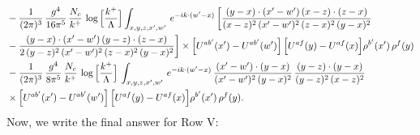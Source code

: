 \documentclass[9pt]{article}
\numberwithin{equation}{section}
\begin{document}
\begin{align}
&-\frac{1}{(2\pi)^{3}}\,\frac{g^{4}}{16\pi^{5}}\,\frac{N_{c}}{k^{+}}\,\log\Big[\frac{k^{+}}{\Lambda}\Big]\int_{x,y,z,x',w'}\,e^{-ik\cdot(w'-x)}\,\bigg[\frac{(y-x)\cdot (x'-w')\,(x-z)\cdot (z-x)}{(x-z)^{2}\,(x'-w')^{2}\,(z-x)^{2}\,(y-x)^{2}}\notag \\ & -\frac{(y-x)\cdot (x'-w')\,(y-z)\cdot (z-x)}{2\,(y-z)^{2}\,(x'-w')^{2}\,(z-x)^{2}\,(y-x)^{2}}\bigg]\times\Big[U^{ab'}(x')-U^{ab'}(w')\Big]\,\Big[U^{af}(y)-U^{af}(x)\Big]\rho^{b'}(x')\,\rho^{f}(y)\notag\\
&-\frac{1}{(2\pi)^{3}}\,\frac{g^{4}}{8\pi^{5}}\,\frac{N_{c}}{k^{+}}\,\log\Big[\frac{k^{+}}{\Lambda}\Big]\,\int_{x,y,z,x',w'}\,e^{-ik\cdot(w'-x)}\,\frac{(x'-w')\cdot(y-x)}{(x'-w')^{2}\,(y-x)^{2}}\,\frac{(y-z)\cdot(y-x)}{(y-z)^{2}\,(x-z)^{2}}\notag\\
&\times\Big[U^{ab'}(x')-U^{ab'}(w')\Big]\,\Big[U^{af}(y)-U^{af}(x)\Big]\rho^{b'}(x')\,\rho^{f}(y).
\end{align}
Now, we write the final answer for Row V:
\end{document}
